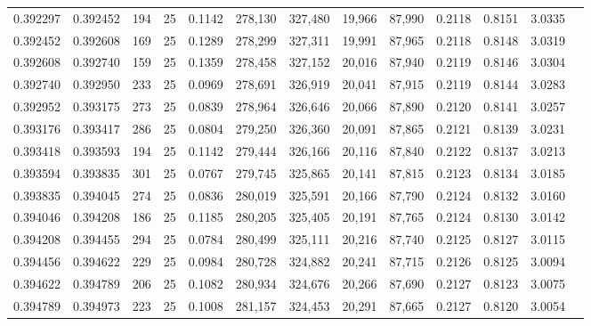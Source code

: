 \begin{tabular}{rrrrrrrrrrrrr}
0.392297 & 0.392452 &   194 &  25 &                                     0.1142 & 278,130 & 327,480 &  19,966 &  87,990 & 0.2118 & 0.8151 & 3.0335 \\
0.392452 & 0.392608 &   169 &  25 &                                     0.1289 & 278,299 & 327,311 &  19,991 &  87,965 & 0.2118 & 0.8148 & 3.0319 \\
0.392608 & 0.392740 &   159 &  25 &                                     0.1359 & 278,458 & 327,152 &  20,016 &  87,940 & 0.2119 & 0.8146 & 3.0304 \\
0.392740 & 0.392950 &   233 &  25 &                                     0.0969 & 278,691 & 326,919 &  20,041 &  87,915 & 0.2119 & 0.8144 & 3.0283 \\
0.392952 & 0.393175 &   273 &  25 &                                     0.0839 & 278,964 & 326,646 &  20,066 &  87,890 & 0.2120 & 0.8141 & 3.0257 \\
0.393176 & 0.393417 &   286 &  25 &                                     0.0804 & 279,250 & 326,360 &  20,091 &  87,865 & 0.2121 & 0.8139 & 3.0231 \\
0.393418 & 0.393593 &   194 &  25 &                                     0.1142 & 279,444 & 326,166 &  20,116 &  87,840 & 0.2122 & 0.8137 & 3.0213 \\
0.393594 & 0.393835 &   301 &  25 &                                     0.0767 & 279,745 & 325,865 &  20,141 &  87,815 & 0.2123 & 0.8134 & 3.0185 \\
0.393835 & 0.394045 &   274 &  25 &                                     0.0836 & 280,019 & 325,591 &  20,166 &  87,790 & 0.2124 & 0.8132 & 3.0160 \\
0.394046 & 0.394208 &   186 &  25 &                                     0.1185 & 280,205 & 325,405 &  20,191 &  87,765 & 0.2124 & 0.8130 & 3.0142 \\
0.394208 & 0.394455 &   294 &  25 &                                     0.0784 & 280,499 & 325,111 &  20,216 &  87,740 & 0.2125 & 0.8127 & 3.0115 \\
0.394456 & 0.394622 &   229 &  25 &                                     0.0984 & 280,728 & 324,882 &  20,241 &  87,715 & 0.2126 & 0.8125 & 3.0094 \\
0.394622 & 0.394789 &   206 &  25 &                                     0.1082 & 280,934 & 324,676 &  20,266 &  87,690 & 0.2127 & 0.8123 & 3.0075 \\
0.394789 & 0.394973 &   223 &  25 &                                     0.1008 & 281,157 & 324,453 &  20,291 &  87,665 & 0.2127 & 0.8120 & 3.0054 \\

\end{tabular}

